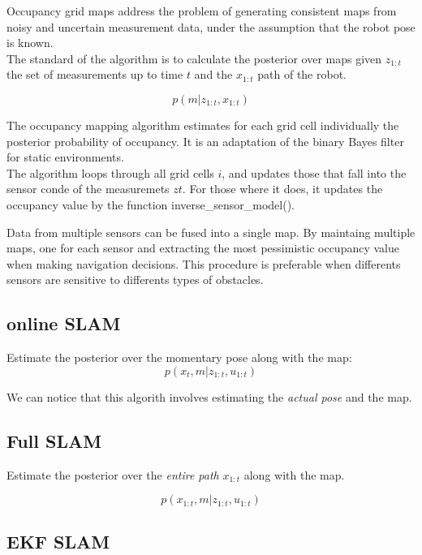 \documentclass[10pt,journal,compsoc]{IEEEtran}
\begin{document}
Occupancy grid maps address the problem of generating consistent maps from noisy and uncertain measurement data, under
the assumption that the robot pose is known.\\
The standard of the algorithm is to calculate the posterior over maps given $z_{1:t}$ the set of measurements up to time
$t$ and the $x_{1:t}$ path of the robot.

\begin{equation}
  p(m|z_{1:t},x_{1:t})
\end{equation}

The occupancy mapping algorithm estimates for each grid cell individually the posterior probability of occupancy. It is
an adaptation of the binary Bayes filter for static environments.\\
The algorithm loops through all grid cells $i$, and updates those that
fall into the sensor conde of the measuremets $zt$. For those where it does, it updates the occupancy value by the
function inverse\_sensor\_model().


Data from multiple sensors can be fused into a single map. By maintaing multiple maps, one for each sensor and
extracting the most pessimistic occupancy value when making navigation decisions. This procedure is preferable when
differents sensors are sensitive to differents types of obstacles.

\subsection{online SLAM}

Estimate the posterior over the momentary pose along with the map:
\begin{equation}
  p(x_t, m| z_{1:t},u_{1:t})
\end{equation}

We can notice that this algorith involves estimating the \textit{actual pose} and the map.
\subsection{Full SLAM}
Estimate the posterior over the \textit{entire path} $x_{1:t}$ along with the map.

\begin{equation}
  p(x_{1:t}, m| z_{1:t},u_{1:t})
\end{equation}

\subsection{EKF SLAM}
\end{document}
